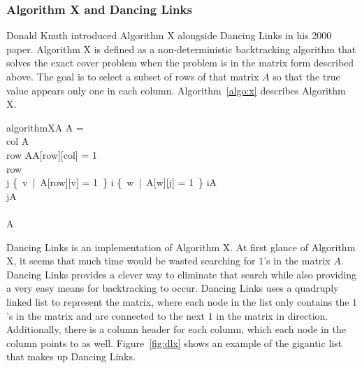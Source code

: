     \subsubsection{Algorithm X and Dancing Links}
    Donald Knuth introduced Algorithm X alongside Dancing Links in his 2000 paper\cite{dlx}. Algorithm X is defined as a non-deterministic
    backtracking algorithm that solves the exact cover problem when the problem is in the matrix form described above. The goal is to select
    a subset of rows of that matrix $A$ so that the true value appears only one in each column. Algorithm~\ref{algo:x} describes Algorithm X.
    \begin{center}\begin{pseudocode}[framebox]{algorithmX}{A}
        \IF A = \emptyset \THEN \RETURN \TRUE                           \\
        col \GETS {}A                                  \\
        row \GETS {}AA[row][col] = 1    \\
        row               \\
        \FOR j \in \{~v~|~A[row][v] = 1~\} \DO \BEGIN
            \FOR i \in \{~w~|~A[w][j] = 1~\} \DO
                iA                        \\
            jA                         \\
        \END                                                            \\
        A
        \label{algo:x}
    \end{pseudocode}\end{center}
    Dancing Links is an implementation of Algorithm X. At first glance of Algorithm X, it seems that much time would be wasted searching
    for $1$'s in the matrix $A$. Dancing Links provides a clever way to eliminate that search while also providing a very easy means for
    backtracking to occur. Dancing Links uses a quadruply linked list to represent the matrix, where each node in the list only contains
    the $1$'s in the matrix and are connected to the next $1$ in the matrix in direction. Additionally, there is a column header for each
    column, which each node in the column points to as well. Figure~\ref{fig:dlx} shows an example of the gigantic list that makes up Dancing Links.
